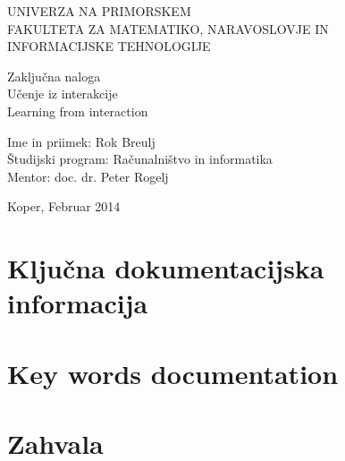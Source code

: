 \documentclass[a4paper, oneside, 12pt]{article}
\begin{document}
\begin{titlepage}
\begin{center}
\begin{large}
UNIVERZA NA PRIMORSKEM\\
FAKULTETA ZA MATEMATIKO, NARAVOSLOVJE IN\\
INFORMACIJSKE TEHNOLOGIJE\\[6cm]
\end{large}
\end{center}

\begin{center}
Zaključna naloga\\
{\large Učenje iz interakcije}\\
Learning from interaction\\[6cm]
\end{center}

\noindent
Ime in priimek: Rok Breulj\\
Študijski program: Računalništvo in informatika\\
Mentor: doc. dr. Peter Rogelj\\

\vfill
\begin{center}
{\large Koper, Februar 2014}
\end{center}
\end{titlepage}

\section*{Ključna dokumentacijska informacija}
\newpage

\section*{Key words documentation}
\newpage

\section*{Zahvala}
\newpage

\tableofcontents
\newpage

\listoftables
\newpage
\end{document}

